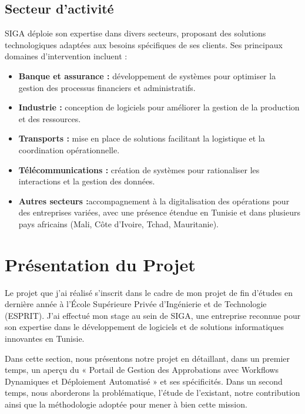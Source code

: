 \subsection{Secteur d'activité}
SIGA déploie son expertise dans divers secteurs, proposant des solutions technologiques adaptées aux besoins spécifiques de ses clients. Ses principaux domaines d’intervention incluent :
\begin{itemize}
    \item \textbf{Banque et assurance : }développement de systèmes pour optimiser la gestion des processus financiers et administratifs.
    \item \textbf{Industrie : }conception de logiciels pour améliorer la gestion de la production et des ressources.
    \item \textbf{Transports : }mise en place de solutions facilitant la logistique et la coordination opérationnelle.
    \item \textbf{Télécommunications : }création de systèmes pour rationaliser les interactions et la gestion des données.
    \item \textbf{Autres secteurs :}accompagnement à la digitalisation des opérations pour des entreprises variées, avec une présence étendue en Tunisie et dans plusieurs pays africains (Mali, Côte d’Ivoire, Tchad, Mauritanie).
\end{itemize}

\section{Présentation du Projet}
Le projet que j’ai réalisé s’inscrit dans le cadre de mon projet de fin d’études en dernière année à l’École Supérieure Privée d’Ingénierie et de Technologie (ESPRIT). J’ai effectué mon stage au sein de SIGA, une entreprise reconnue pour son expertise dans le développement de logiciels et de solutions informatiques innovantes en Tunisie.

Dans cette section, nous présentons notre projet en détaillant, dans un premier temps, un aperçu du « Portail de Gestion des Approbations avec Workflows Dynamiques et Déploiement Automatisé » et ses spécificités. Dans un second temps, nous aborderons la problématique, l’étude de l’existant, notre contribution ainsi que la méthodologie adoptée pour mener à bien cette mission.
